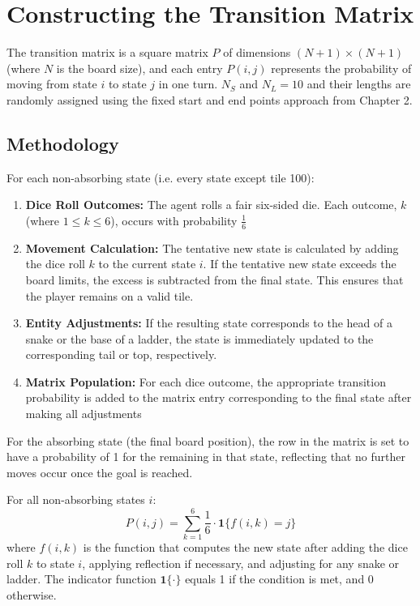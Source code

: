 \documentclass[12pt]{report}
\begin{document}
	\section{Constructing the Transition Matrix}
	The transition matrix is a square matrix $P$ of dimensions $(N+1)  \times (N+1)$ (where $N$ is the board size), and each entry $P(i,j)$ represents the probability of moving from state $i$ to state $j$ in one turn. $N_S$ and $N_L = 10$ and their lengths are randomly assigned using the fixed start and end points approach from Chapter 2.
	
	\subsection{Methodology}
	For each non-absorbing state (i.e. every state except tile 100):
	\begin{enumerate}
		\item \textbf{Dice Roll Outcomes:} The agent rolls a fair six-sided die. Each outcome, $k$ (where $1 \leq k \leq 6$), occurs with probability $\frac{1}{6}$
		\item \textbf{Movement Calculation:} The tentative new state is calculated by adding the dice roll $k$ to the current state $i$. If the tentative new state exceeds the board limits, the excess is subtracted from the final state. This ensures that the player remains on a valid tile.
		\item \textbf{Entity Adjustments:} If the resulting state corresponds to the head of a snake or the base of a ladder, the state is immediately updated to the corresponding tail or top, respectively.
		\item \textbf{Matrix Population:} For each dice outcome, the appropriate transition probability is added to the matrix entry corresponding to the final state after making all adjustments
	\end{enumerate}
	
	For the absorbing state (the final board position), the row in the matrix is set to have a probability of 1 for the remaining in that state, reflecting that no further moves occur once the goal is reached.
	
	For all non-absorbing states $i$:
	\[
	P(i, j) = \sum_{k=1}^{6} \frac{1}{6} \cdot \mathbf{1}\{ f(i,k) = j \}
	\]
	where $f(i,k)$ is the function that computes the new state after adding the dice roll $k$ to state $i$, applying reflection if necessary, and adjusting for any snake or ladder. The indicator function $\mathbf{1}\{\cdot\}$ equals 1 if the condition is met, and 0 otherwise.
	
\end{document}
